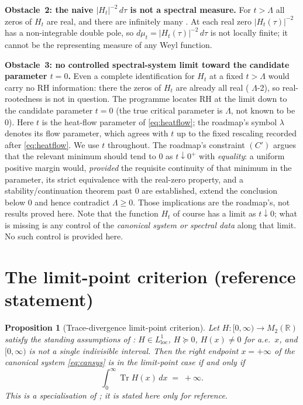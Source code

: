 \documentclass[12pt,a4paper]{amsart}
\theoremstyle{plain}
\newtheorem{proposition}[theorem]{Proposition}
\theoremstyle{definition}
\newcommand{\R}{\mathbb{R}}
\newcommand{\Tr}{\operatorname{Tr}}
\newcommand{\Ham}{H}
\begin{document}
\medskip\noindent\textbf{Obstacle~2: the naive $|H_t|^{-2}\,d\tau$ is not
a spectral measure.}
For $t>\Lambda$ all zeros of $H_t$ are real, and there are infinitely
many \cite{KiKimLee2009,RodgersTao2020}.  At each real zero
$|H_t(\tau)|^{-2}$ has a non-integrable double pole, so
$d\mu_t = |H_t(\tau)|^{-2}\,d\tau$ is not locally finite; it cannot be the
representing measure of any Weyl function.

\medskip\noindent\textbf{Obstacle~3: no controlled spectral-system limit
toward the candidate parameter $t=0$.}
Even a complete identification for $H_t$ at a fixed $t>\Lambda$ would
carry no RH information: there the zeros of $H_t$ are already all real
(\cite{SpecRoadmap} $\Lambda$-2), so real-rootedness is not in question.
The programme locates RH at the limit down to the candidate parameter
$t=0$ (the true critical parameter is $\Lambda$, not known to be $0$).
Here $t$ is the heat-flow parameter of \cref{eq:heatflow}; the roadmap's
symbol $\lambda$ denotes its flow parameter, which agrees with $t$ up to
the fixed rescaling recorded after \cref{eq:heatflow}.  We use $t$
throughout.  The roadmap's constraint $(C')$ argues that the relevant
minimum should tend to $0$ as $t\downarrow0^+$ with \emph{equality}: a
uniform positive margin would, \emph{provided} the requisite continuity
of that minimum in the parameter, its strict equivalence with the
real-zero property, and a stability/continuation theorem past $0$ are
established, extend the conclusion below $0$ and hence contradict
$\Lambda\ge0$.  Those implications are the roadmap's, not results proved
here.  Note that the function $H_t$ of course has a limit as
$t\downarrow0$; what is missing is any control of the \emph{canonical
system or spectral data} along that limit.  No such control is provided
here.

\section{The limit-point criterion (reference statement)}
\label{sec:L3}

\begin{proposition}[Trace-divergence limit-point criterion]\label{prop:weyl}
  Let $\Ham \colon [0,\infty) \to M_2(\R)$ satisfy the standing
  assumptions of \cite{Remling2018}: $\Ham \in L^1_{\mathrm{loc}}$,
  $\Ham \succeq 0$, $\Ham(x)\neq 0$ for a.e.\ $x$, and $[0,\infty)$ is not
  a single indivisible interval.  Then the right endpoint $x=+\infty$ of
  the canonical system \cref{eq:cansys} is in the limit-point case if and
  only if
  \[
    \int_0^{\infty} \Tr\Ham(x)\,dx \;=\; +\infty.
  \]
  This is a specialisation of \cite[Theorem~3.5]{Remling2018}; it is
  stated here only for reference.
\end{proposition}
\end{document}
